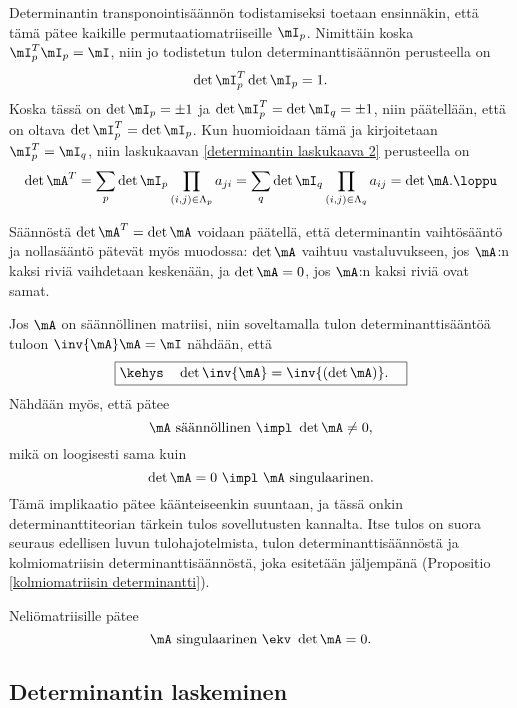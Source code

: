 Determinantin transponointisäännön todistamiseksi toetaan ensinnäkin, että tämä pätee kaikille
permutaatiomatriiseille $\mI_p$. Nimittäin koska $\mI_p^T\mI_p=\mI$, niin jo todistetun tulon
determinanttisäännön perusteella on
\[
\det\mI_p^T\det\mI_p = 1.
\]
Koska tässä on $\det\mI_p=\pm 1$ ja $\det\mI_p^T=\det\mI_q=\pm 1$, niin päätellään, että on
oltava $\det\mI_p^T=\det\mI_p$. Kun huomioidaan tämä ja kirjoitetaan $\mI_p^T=\mI_q$, niin
laskukaavan \eqref{determinantin laskukaava 2} perusteella on
\[
\det\mA^T = \sum_p \det\mI_p \prod_{(i,j)\in\Lambda_p} a_{ji}
          = \sum_q \det\mI_q \prod_{(i,j)\in\Lambda_q} a_{ij} = \det\mA. \loppu
\]

Säännöstä $\det\mA^T=\det\mA$ voidaan päätellä, että determinantin vaihtösääntö ja nollasääntö
pätevät myös muodossa: $\det\mA$ vaihtuu vastaluvukseen, jos $\mA$:n kaksi riviä vaihdetaan 
keskenään, ja $\det\mA=0$, jos $\mA$:n kaksi riviä ovat samat.
  
Jos $\mA$ on säännöllinen matriisi, niin soveltamalla tulon determinanttisääntöä tuloon 
$\inv{\mA}\mA=\mI$ nähdään, että
\[
\boxed{\kehys\quad \det\inv{\mA}=\inv{(\det\mA)}. \quad}
\]
Nähdään myös, että pätee
\[
\mA \text{ säännöllinen } \impl \ \det\mA \neq 0,
\]
mikä on loogisesti sama kuin
\[
\det\mA=0 \ \impl \ \mA \text{ singulaarinen.}
\]
Tämä implikaatio pätee käänteiseenkin suuntaan, ja tässä onkin determinanttiteorian tärkein 
tulos sovellutusten kannalta. Itse tulos on suora seuraus edellisen luvun tulohajotelmista, 
tulon determinanttisäännöstä ja kolmiomatriisin determinanttisäännöstä, joka esitetään 
jäljempänä (Propositio \ref{kolmiomatriisin determinantti}).
\begin{Lause} \label{determinanttilause} 
 Neliömatriisille pätee
\[
\mA \text{ singulaarinen } \ekv \ \det\mA=0.
\]
\end{Lause}

\subsection*{Determinantin laskeminen}

